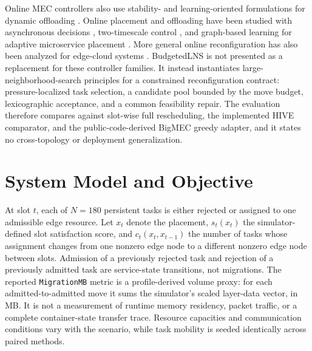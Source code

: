 \documentclass[preprint,12pt]{elsarticle}
\begin{document}
Online MEC controllers also use stability- and learning-oriented
formulations for dynamic offloading
\citep{mao2016dynamic, bi2021lyapunov}. Online placement and offloading
have been studied with asynchronous decisions
\citep{li2021asyncoffload}, two-timescale control
\citep{li2023twotimescale}, and graph-based learning for adaptive
microservice placement
\citep{chen2024adaptiveplacement, ray2024learningmigration}. More
general online reconfiguration has also been analyzed for edge-cloud
systems \citep{hou2016reconfig}. BudgetedLNS is not presented as a
replacement for these controller families. It instead instantiates
large-neighborhood-search principles \citep{pisinger2010lns} for a
constrained reconfiguration contract: pressure-localized task selection,
a candidate pool bounded by the move budget, lexicographic acceptance,
and a common feasibility repair. The evaluation therefore compares
against slot-wise full rescheduling, the implemented HIVE comparator, and
the public-code-derived BigMEC greedy adapter, and it states no
cross-topology or deployment generalization.

\section{System Model and Objective}\label{system-model-and-objective}

At slot \(t\), each of \(N=180\) persistent tasks is either rejected or
assigned to one admissible edge resource. Let \(x_t\) denote the
placement, \(s_t(x_t)\) the simulator-defined slot satisfaction score,
and \(c_t(x_t,x_{t-1})\) the number of tasks whose assignment changes
from one nonzero edge node to a different nonzero edge node between
slots. Admission of a previously rejected task and rejection of a
previously admitted task are service-state transitions, not migrations.
The reported \texttt{MigrationMB} metric is a profile-derived volume
proxy: for each admitted-to-admitted move it sums the simulator's
scaled layer-data vector, in MB. It is not a measurement of runtime
memory residency, packet traffic, or a complete container-state transfer
trace. Resource capacities and
communication conditions vary with the scenario, while task mobility is
seeded identically across paired methods.
\end{document}
